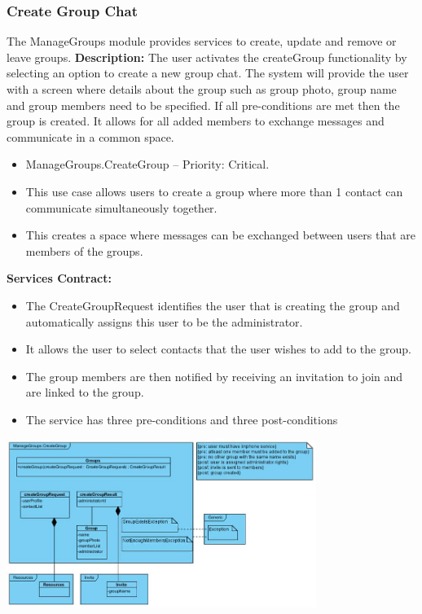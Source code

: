 \documentclass[11pt]{article}
\begin{document}
\subsubsection{Create Group Chat} \label{FR-create-group}
The ManageGroups module provides services to create, update and remove or leave groups.\newline
\textbf{Description:} The user activates the createGroup functionality by selecting an option to create a new group chat. The system will provide the user with a screen where details about the group such as group photo, group name and group members need to be specified. If all pre-conditions are met then the group is created. It allows for all added members to exchange messages and communicate in a common space.\newline
\newline
\begin{itemize}
\item ManageGroups.CreateGroup – Priority: Critical.
\item	This use case allows users to create a group where more than 1 contact can communicate simultaneously together.
\item	This creates a space where messages can be exchanged between users that are members of the groups.
\end{itemize}
\textbf{Services Contract:} \newline
	\newline
\begin{itemize}
\item The CreateGroupRequest identifies the user that is creating the group and automatically assigns this user to be the administrator.
\item It allows the user to select contacts that the user wishes to add to the group.
\item The group members are then notified by receiving an invitation to join and are linked to the group.
\item The service has three pre-conditions and three post-conditions
\end{itemize}
\includegraphics[width=380px]{./images/serviceContract-create.jpg} \newline
\end{document}
